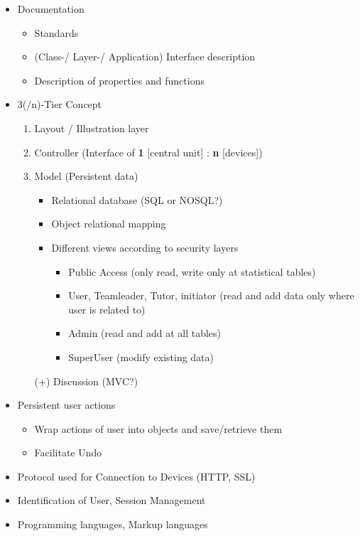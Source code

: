 \documentclass[11pt]{article}
\begin{document}
	\begin{itemize}
	\item Documentation
		\begin{itemize}
		\item Standards
		\item (Class-/ Layer-/ Application) Interface description 
		\item Description of properties and functions
		\end{itemize}
	\item 3(/n)-Tier Concept
		\begin{enumerate}
		\item Layout / Illustration layer
		\item Controller (Interface of \textbf{1} [central unit] : \textbf{n}  [devices])
		\item Model (Persistent data)
			\begin{itemize}
			\item Relational database (SQL or NOSQL?)
			\item Object relational mapping
			\item Different views according to security layers
				\begin{itemize}
				\item Public Access (only read, write only at statistical tables)
				\item User, Teamleader, Tutor, initiator (read and add data only where user is related to)
				\item Admin (read and add at all tables)
				\item SuperUser (modify existing data)
				\end{itemize}
			\end{itemize}
		\item[(+)] Discussion (MVC?)
		\end{enumerate}
	\item Persistent user actions
		\begin{itemize}
		\item Wrap actions of user into objects and save/retrieve them \cite{entwurfsmuster}
		\item Facilitate Undo
		\end{itemize}
	\item Protocol used for Connection to Devices (HTTP, SSL)
	\item Identification of User, Session Management
	\item Programming languages, Markup languages
		\begin{itemize}

\end{itemize}
\end{itemize}
\end{document}
